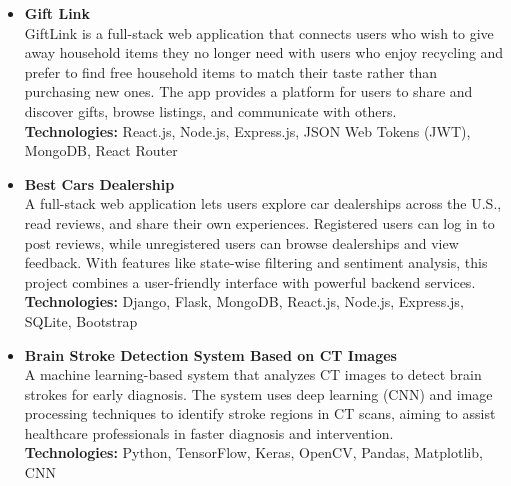 
\begin{itemize}

    \item 
    {\large \textbf{Gift Link}} \\
    GiftLink is a full-stack web application that connects users who wish to give away household items they no longer need with users who enjoy recycling and prefer to find free household items to match their taste rather than purchasing new ones. The app provides a platform for users to share and discover gifts, browse listings, and communicate with others. \\
    \textbf{Technologies:} React.js, Node.js, Express.js, JSON Web Tokens (JWT), MongoDB, React Router
    \\
    \item 
    {\large \textbf{Best Cars Dealership}} \\
    A full-stack web application lets users explore car dealerships across the U.S., read reviews, and share their own experiences. Registered users can log in to post reviews, while unregistered users can browse dealerships and view feedback. With features like state-wise filtering and sentiment analysis, this project combines a user-friendly interface with powerful backend services. \\
    \textbf{Technologies:} Django, Flask, MongoDB, React.js, Node.js, Express.js, SQLite, Bootstrap
    \\
    \item 
    {\large \textbf{Brain Stroke Detection System Based on CT Images}} \\
    A machine learning-based system that analyzes CT images to detect brain strokes for early diagnosis. The system uses deep learning (CNN) and image processing techniques to identify stroke regions in CT scans, aiming to assist healthcare professionals in faster diagnosis and intervention.\\
    \textbf{Technologies:} Python, TensorFlow, Keras, OpenCV, Pandas, Matplotlib, CNN

\end{itemize}
